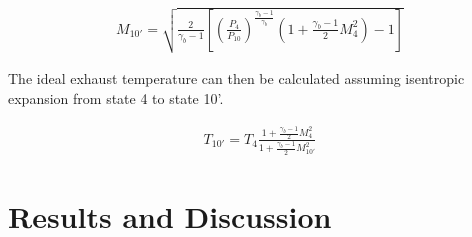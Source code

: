 \documentclass[a4paper]{article}
\begin{document}
\begin{align}\label{eqn:exhaust_mach}
    M_{10'} = \sqrt{\frac{2}{\gamma_b - 1} \left[ \left(\frac{P_4}{P_10} \right)^{\frac{\gamma_b-1}{\gamma_b}}\left( 1 + \frac{\gamma_b - 1}{2}M_4^2 \right) - 1 \right]}
\end{align}

The ideal exhaust temperature can then be calculated assuming isentropic expansion from state 4 to state 10'.

\begin{align}
    T_{10'} = T_4 \frac{1 + \frac{\gamma_b - 1}{2}M_4^2}{1 + \frac{\gamma_b - 1}{2}M_{10'}^2}
\end{align}



\section{Results and Discussion}
\end{document}
